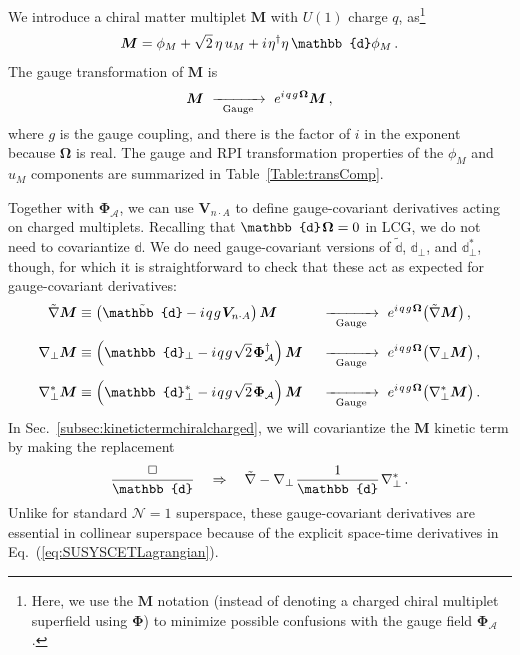 \documentclass[12pt,document,nofootinbib,superscriptaddress,onecolumn,preprintnumbers,balancelastpage]{article}
\newcommand{\s}{\hspace{0.8pt}}
\newcommand{\PP}{\mathbb{d}}
\newcommand{\gauge}{\,\,\xrightarrow[\hspace{5pt}\text{Gauge}\hspace{5pt}]{}\,\,}
\DeclareRobustCommand{\Sec}[1]{Sec.~\ref{#1}}
\DeclareRobustCommand{\Tab}[1]{Table~\ref{#1}}
\DeclareRobustCommand{\Eq}[1]{Eq.~(\ref{#1})}
\newcommand{\bPhi}{ \boldsymbol \Phi}
\newcommand{\bM}{ \boldsymbol M}
\newcommand{\bPhiA}{ \boldsymbol{\Phi}_\alc}
\newcommand{\bD}{ \boldsymbol{V}_{n \cdot A}}
\newcommand{\bPhialc}{ \boldsymbol{\Phi}_\alc}
\newcommand{\RCA}{\boldsymbol{\Omega}}
\newcommand{\alc}{\mathcal{A}}
\begin{document}
\begin{spacing}{1.2}
We introduce a chiral matter multiplet $\bM$ with $U(1)$ charge $q$, as\footnote{Here, we use the $\bM$ notation (instead of denoting a charged chiral multiplet superfield using $\bPhi$) to minimize possible confusions with the gauge field $\bPhiA$.}
%
\begin{align}
\bM = \phi_M + \sqrt{2}\, \eta \, u_M + i\s \eta^\dagger \eta \, \PP \phi_M \,.
\end{align}
%
The gauge transformation of $\bM$ is
%
\begin{equation}
\label{eq:matter_transformation}
\bM \gauge e^{i\s q\s g \s\RCA} \bM\,,
\end{equation}
%
where $g$ is the gauge coupling, and there is the factor of $i$ in the exponent because $\RCA$ is real. 
%
The gauge and RPI transformation properties of the $\phi_M$ and $u_M$ components are summarized in \Tab{Table:transComp}.


Together with $\bPhialc$, we can use $\bD$ to define gauge-covariant derivatives acting on charged multiplets.
%
Recalling that $\PP\s \RCA = 0$ in LCG, we do not need to covariantize $\PP$.
%
We do need gauge-covariant versions of $\tilde{\PP}$, $\PP_\perp$, and $\PP_\perp^*$, though, for which it is straightforward to check that these act as expected for gauge-covariant derivatives:
%
\begin{alignat}{2}
\tilde{\nabla} \bM &\equiv \left(\tilde{\PP} - i\s q\s g\s \bD \right) \bM &&\gauge e^{i \s q\s g\s \RCA} \big(\tilde{\nabla} \bM\big)\,, \notag\\[4pt]
\nabla_\perp \bM &\equiv \left(\PP_\perp - i\s q\s g\s \sqrt{2}\s \bPhiA^\dagger \right) \bM &&\gauge e^{i \s q\s g\s \RCA} \big(\nabla_\perp \bM\big) \,,\notag\\[4pt]  
\nabla_\perp^*\bM &\equiv \left(\PP_\perp^* - i\s q\s g\s  \sqrt{2}\s \bPhiA \right) \bM &&\gauge e^{i \s q\s g\s \RCA} \big(\nabla_\perp^* \bM\big) \,.  \label{eq:nabla_def}
\end{alignat}
%
In \Sec{subsec:kinetictermchiralcharged}, we will covariantize the $\bM$ kinetic term by making the replacement 
%
\begin{equation}
\label{eq:BoxReplaceM}
\frac{\Box}{\PP} \quad \Rightarrow \quad \tilde{\nabla} - \nabla_\perp\s \frac{1}{\PP}\s \nabla_\perp^*\,.
\end{equation}
%
Unlike for standard $\mathcal{N} = 1$ superspace, these gauge-covariant derivatives are essential in collinear superspace because of the explicit space-time derivatives in \Eq{eq:SUSYSCETLagrangian}.



\end{spacing}
\end{document}
